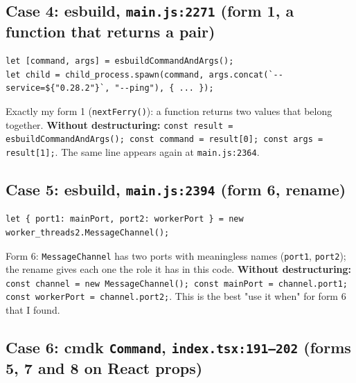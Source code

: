 \documentclass[
  10pt,
]{article}
\begin{document}
\hypertarget{case-4-esbuild-mainjs2271-form-1-a-function-that-returns-a-pair}{%
\subsection{\texorpdfstring{Case 4: esbuild,
\texttt{main.\allowbreak{}js:\allowbreak{}2271} (form 1, a function that
returns a
pair)}{Case 4: esbuild,  (form 1, a function that returns a pair)}}\label{case-4-esbuild-mainjs2271-form-1-a-function-that-returns-a-pair}}

\begin{verbatim}
let [command, args] = esbuildCommandAndArgs();
let child = child_process.spawn(command, args.concat(`--service=${"0.28.2"}`, "--ping"), { ... });
\end{verbatim}

Exactly my form 1 (\texttt{nextFerry(\allowbreak{})}): a function
returns two values that belong together. \textbf{Without destructuring:}
\texttt{const result =\allowbreak{} esbuildCommandAndArgs(\allowbreak{}); const command =\allowbreak{} result[\allowbreak{}0]; const args =\allowbreak{} result[\allowbreak{}1];}.
The same line appears again at
\texttt{main.\allowbreak{}js:\allowbreak{}2364}.

\hypertarget{case-5-esbuild-mainjs2394-form-6-rename}{%
\subsection{\texorpdfstring{Case 5: esbuild,
\texttt{main.\allowbreak{}js:\allowbreak{}2394} (form 6,
rename)}{Case 5: esbuild,  (form 6, rename)}}\label{case-5-esbuild-mainjs2394-form-6-rename}}

\begin{verbatim}
let { port1: mainPort, port2: workerPort } = new worker_threads2.MessageChannel();
\end{verbatim}

Form 6: \texttt{MessageChannel} has two ports with meaningless names
(\texttt{port1}, \texttt{port2}); the rename gives each one the role it
has in this code. \textbf{Without destructuring:}
\texttt{const channel =\allowbreak{} new MessageChannel(\allowbreak{}); const mainPort =\allowbreak{} channel.\allowbreak{}port1; const workerPort =\allowbreak{} channel.\allowbreak{}port2;}.
This is the best "use it when" for form 6 that I found.

\hypertarget{case-6-cmdk-command-indextsx191202-forms-5-7-and-8-on-react-props}{%
\subsection{\texorpdfstring{Case 6: cmdk \texttt{Command},
\texttt{index.\allowbreak{}tsx:\allowbreak{}191–202} (forms 5, 7 and 8
on React
props)}{Case 6: cmdk ,  (forms 5, 7 and 8 on React props)}}\label{case-6-cmdk-command-indextsx191202-forms-5-7-and-8-on-react-props}}
\end{document}

